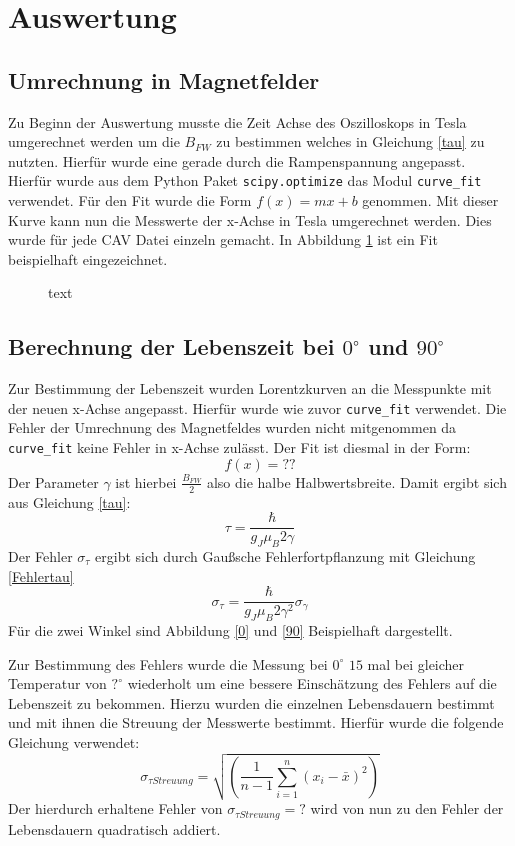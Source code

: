 \section{Auswertung}
\subsection{Umrechnung in Magnetfelder}
Zu Beginn der Auswertung musste die Zeit Achse des Oszilloskops in Tesla umgerechnet werden um die $B_{FW}$ zu bestimmen welches in Gleichung \ref{tau} zu nutzten. Hierfür wurde eine gerade durch die Rampenspannung angepasst. Hierfür wurde aus dem Python Paket \verb|scipy.optimize| das Modul \verb|curve_fit| verwendet. Für den Fit wurde die Form $f(x)=mx+b$ genommen. Mit dieser Kurve kann nun die Messwerte der x-Achse in Tesla umgerechnet werden. Dies wurde für jede CAV Datei einzeln gemacht. In Abbildung \ref{MagnetfeldAbbildung} ist ein Fit beispielhaft eingezeichnet.\par
\begin{figure}[ht]
	\centering
	\caption{text}
	\label{MagnetfeldAbbildung}
\end{figure}
\subsection{Berechnung der Lebenszeit bei $0^\circ$ und $90^\circ$}
Zur Bestimmung der Lebenszeit wurden Lorentzkurven an die Messpunkte mit der neuen x-Achse angepasst. Hierfür wurde wie zuvor \verb|curve_fit| verwendet. Die Fehler der Umrechnung des Magnetfeldes wurden nicht mitgenommen da \verb|curve_fit| keine Fehler in x-Achse zulässt. Der Fit ist diesmal in der Form:
\begin{equation}
	f(x)=??
	\label{Lorenzfit}
\end{equation}
Der Parameter $\gamma$ ist hierbei $\frac{B_{FW}}{2}$ also die halbe Halbwertsbreite. Damit ergibt sich aus Gleichung \ref{tau}:
\begin{equation}
	\tau=\frac{\hbar}{g_J\mu_B2\gamma}
\end{equation} 
Der Fehler $\sigma_\tau$ ergibt sich durch Gaußsche Fehlerfortpflanzung mit Gleichung \ref{Fehlertau}
\begin{equation}
	\sigma_\tau=\frac{\hbar}{g_J\mu_B2\gamma^2}\sigma_\gamma
	\label{Fehlertau}
\end{equation}
Für die zwei Winkel sind Abbildung \ref{0} und \ref{90} Beispielhaft dargestellt.\par
Zur Bestimmung des Fehlers wurde die Messung bei $0^\circ$ $15$ mal bei gleicher Temperatur von $?^\circ$ wiederholt um eine bessere Einschätzung des Fehlers auf die Lebenszeit zu bekommen. Hierzu wurden die einzelnen Lebensdauern bestimmt und mit ihnen die Streuung der Messwerte bestimmt. Hierfür wurde die folgende Gleichung verwendet:
\begin{equation}
	\sigma_{\tau Streuung}=\sqrt{\left(\frac{1}{n-1}\sum_{i=1}^{n}(x_i-\bar{x})^2\right)}
\end{equation}
Der hierdurch erhaltene Fehler  von $\sigma_{\tau Streuung}=?$ wird von nun zu den Fehler der Lebensdauern quadratisch addiert.
